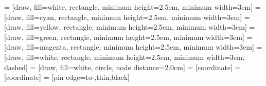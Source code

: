  = [draw, fill=white, rectangle, minimum height=2.5em, minimum width=3em]
 = [draw, fill=cyan, rectangle, minimum height=2.5em, minimum width=3em]
 = [draw, fill=yellow, rectangle, minimum height=2.5em, minimum width=3em]
 = [draw, fill=green, rectangle, minimum height=2.5em, minimum width=3em]
 = [draw, fill=magenta, rectangle, minimum height=2.5em, minimum width=3em]
 = [draw, fill=white, rectangle, minimum height=2.5em, minimum width=3em, dashed]
 = [draw, fill=white, circle, node distance=2.0cm]
 = [coordinate]
 = [coordinate]
 = [pin edge={to-,thin,black}]

\usetikzlibrary{positioning}
\makeatletter
{}
\makeatother

